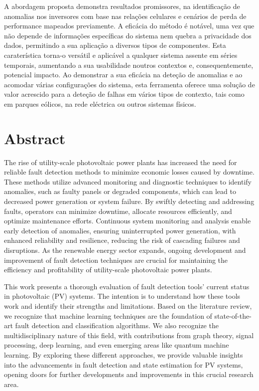 A abordagem proposta demonstra resultados promissores, na identificação de anomalias nos inversores com base nas relações celulares e cenários de perda de performance mapeados previamente. A eficácia do método é notável, uma vez que não depende de informações específicas do sistema nem quebra a privacidade dos dados, permitindo a sua aplicação a diversos tipos de componentes. Esta caraterística torna-o versátil e aplicável a qualquer sistema assente em séries temporais, aumentando a sua usabilidade noutros contextos e, consequentemente, potencial impacto. Ao demonstrar a sua eficácia na deteção de anomalias e ao acomodar várias configurações do sistema, esta ferramenta oferece uma solução de valor acrescido para a deteção de falhas em vários tipos de contexto, tais como em parques eólicos, na rede eléctrica ou outros sistemas físicos.

\chapter*{Abstract}
The rise of utility-scale photovoltaic power plants has increased the need for reliable fault detection methods to minimize economic losses caused by downtime. These methods utilize advanced monitoring and diagnostic techniques to identify anomalies, such as faulty panels or degraded components, which can lead to decreased power generation or system failure. By swiftly detecting and addressing faults, operators can minimize downtime, allocate resources efficiently, and optimize maintenance efforts. Continuous system monitoring and analysis enable early detection of anomalies, ensuring uninterrupted power generation, with enhanced reliability and resilience, reducing the risk of cascading failures and disruptions. As the renewable energy sector expands, ongoing development and improvement of fault detection techniques are crucial for maintaining the efficiency and profitability of utility-scale photovoltaic power plants.

This work presents a thorough evaluation of fault detection tools' current status in photovoltaic (PV) systems. The intention is to understand how these tools work and identify their strengths and limitations. Based on the literature review, we recognize that machine learning techniques are the foundation of state-of-the-art fault detection and classification algorithms. We also recognize the multidisciplinary nature of this field, with contributions from graph theory, signal processing, deep learning, and even emerging areas like quantum machine learning. By exploring these different approaches, we provide valuable insights into the advancements in fault detection and state estimation for PV systems, opening doors for further developments and improvements in this crucial research area.


